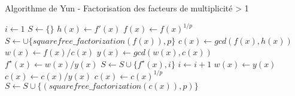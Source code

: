 \begin{algorithm}
  \caption{Algorithme de Yun - Factorisation des facteurs de multiplicit\'e > 1}
  \begin{algorithmic}[1]
    \Statex
      \State $i \gets 1$
      \State $S \gets \{\}$
      \State $h(x) \gets f'(x)$
        \State $f(x) \gets f(x)^{1/p}$
        \State $S \gets \cup \{squarefree\_factorization(f(x)), p\}$
      \Else
        \State $c(x) \gets gcd(f(x), h(x))$
        \State $w(x) \gets f(x)/c(x)$
          \State $y(x) \gets gcd(w(x), c(x))$
          \State $f^{\star}(x) \gets w(x)/y(x)$
          \State $S \gets S \cup \{f^{\star} (x), i\}$
          \State $i \gets i+1$
          \State $w(x) \gets y(x)$
          \State $c(x) \gets c(x)/y(x)$
        \EndWhile
          \State $c(x) \gets c(x)^{1/p}$
          \State $S \gets S \cup \{(squarefree\_factorization(c(x)),p)\} $
        \EndIf
      \EndIf
      \State {}
    \EndFunction
  \end{algorithmic}
\end{algorithm}
